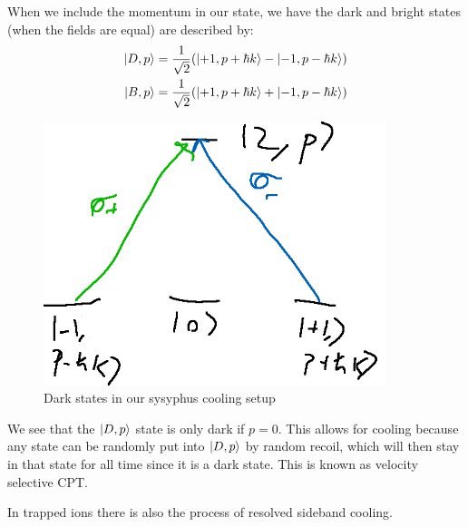 When we include the momentum in our state, we have the dark and bright states (when the fields are equal) are described by:
\begin{align*}
	\ket{D,p} &= \frac{1}{\sqrt{2}}(\ket{+1,p+\hbar k} - \ket{-1,p-\hbar k}) \\
	\ket{B,p} &= \frac{1}{\sqrt{2}}(\ket{+1,p+\hbar k} + \ket{-1,p-\hbar k})
\end{align*}
\begin{figure}[h!]
	\centering
	\includegraphics[width=10cm]{images/12-05-3.png}
	\caption*{Dark states in our sysyphus cooling setup}
\end{figure}
We see that the $\ket{D,p}$ state is only dark if $p=0$. This allows for cooling because any state can be randomly put into $\ket{D,p}$ by random recoil, which will then stay in that state for all time since it is a dark state.
This is known as velocity selective CPT.

In trapped ions there is also the process of resolved sideband cooling.
